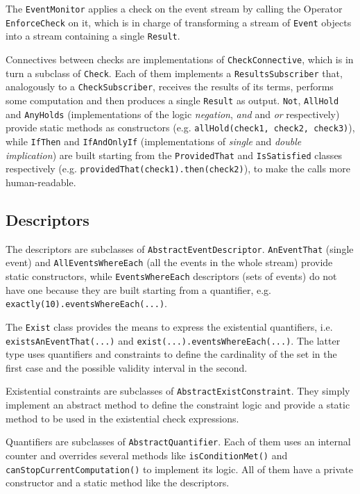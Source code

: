 \documentclass[11pt,a4paper,notitlepage]{article}
\begin{document}
The \texttt{EventMonitor} applies a check on the event stream by calling the Operator \texttt{EnforceCheck} on it, which is in charge of transforming a stream of \texttt{Event} objects into a stream containing a single \texttt{Result}.

Connectives between checks are implementations of \texttt{CheckConnective}, which is in turn a subclass of \texttt{Check}. Each of them implements a \texttt{ResultsSubscriber} that, analogously to a \texttt{CheckSubscriber}, receives the results of its terms, performs some computation and then produces a single \texttt{Result} as output. \texttt{Not}, \texttt{AllHold} and \texttt{AnyHolds} (implementations of the logic \textit{negation}, \textit{and} and \textit{or} respectively) provide static methods as constructors (e.g. \texttt{allHold(check1, check2, check3)}), while \texttt{IfThen} and \texttt{IfAndOnlyIf} (implementations of \textit{single} and \textit{double implication}) are built starting from the \texttt{ProvidedThat} and \texttt{IsSatisfied} classes respectively (e.g. \texttt{providedThat(check1).then(check2)}), to make the calls more human-readable.

\subsection{Descriptors}
The descriptors are subclasses of \texttt{AbstractEventDescriptor}. \texttt{AnEventThat} (single event) and \texttt{AllEventsWhereEach} (all the events in the whole stream) provide static constructors, while \texttt{EventsWhereEach} descriptors (sets of events) do not have one because they are built starting from a quantifier, e.g. \texttt{exactly(10).eventsWhereEach(...)}.

The \texttt{Exist} class provides the means to express the existential quantifiers, i.e. \texttt{existsAnEventThat(...)} and \texttt{exist(...).eventsWhereEach(...)}. The latter type uses quantifiers and constraints to define the cardinality of the set in the first case and the possible validity interval in the second.

Existential constraints are subclasses of \texttt{AbstractExistConstraint}. They simply implement an abstract method to define the constraint logic and provide a static method to be used in the existential check expressions.

Quantifiers are subclasses of \texttt{AbstractQuantifier}. Each of them uses an internal counter and overrides several methods like \texttt{isConditionMet()} and \texttt{canStopCurrentComputation()} to implement its logic. All of them have a private constructor and a static method like the descriptors.
\end{document}

